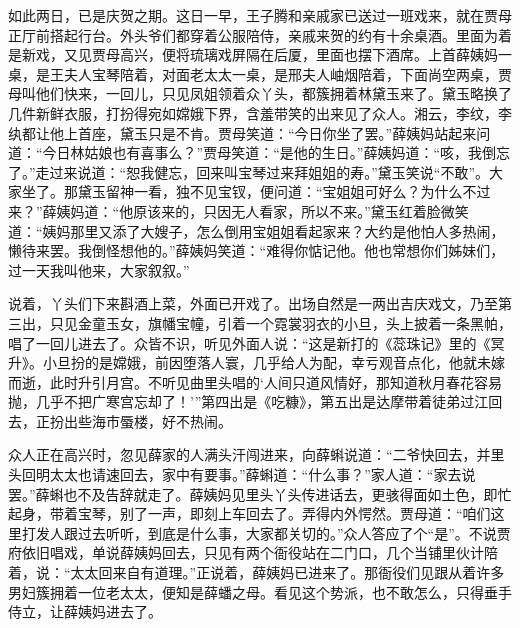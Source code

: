 \begin{parag}
    如此两日，已是庆贺之期。这日一早，王子腾和亲戚家已送过一班戏来，就在贾母正厅前搭起行台。外头爷们都穿着公服陪侍，亲戚来贺的约有十余桌酒。里面为着是新戏，又见贾母高兴，便将琉璃戏屏隔在后厦，里面也摆下酒席。上首薛姨妈一桌，是王夫人宝琴陪着，对面老太太一桌，是邢夫人岫烟陪着，下面尚空两桌，贾母叫他们快来，一回儿，只见凤姐领着众丫头，都簇拥着林黛玉来了。黛玉略换了几件新鲜衣服，打扮得宛如嫦娥下界，含羞带笑的出来见了众人。湘云，李纹，李纨都让他上首座，黛玉只是不肯。贾母笑道：“今日你坐了罢。”薛姨妈站起来问道：“今日林姑娘也有喜事么？”贾母笑道：“是他的生日。”薛姨妈道：“咳，我倒忘了。”走过来说道：“恕我健忘，回来叫宝琴过来拜姐姐的寿。”黛玉笑说“不敢”。大家坐了。那黛玉留神一看，独不见宝钗，便问道：“宝姐姐可好么？为什么不过来？”薛姨妈道：“他原该来的，只因无人看家，所以不来。”黛玉红着脸微笑道：“姨妈那里又添了大嫂子，怎么倒用宝姐姐看起家来？大约是他怕人多热闹，懒待来罢。我倒怪想他的。”薛姨妈笑道：“难得你惦记他。他也常想你们姊妹们，过一天我叫他来，大家叙叙。”
\end{parag}


\begin{parag}
    说着，丫头们下来斟酒上菜，外面已开戏了。出场自然是一两出吉庆戏文，乃至第三出，只见金童玉女，旗幡宝幢，引着一个霓裳羽衣的小旦，头上披着一条黑帕，唱了一回儿进去了。众皆不识，听见外面人说：“这是新打的《蕊珠记》里的《冥升》。小旦扮的是嫦娥，前因堕落人寰，几乎给人为配，幸亏观音点化，他就未嫁而逝，此时升引月宫。不听见曲里头唱的‘人间只道风情好，那知道秋月春花容易抛，几乎不把广寒宫忘却了！’”第四出是《吃糠》，第五出是达摩带着徒弟过江回去，正扮出些海市蜃楼，好不热闹。
\end{parag}


\begin{parag}
    众人正在高兴时，忽见薛家的人满头汗闯进来，向薛蝌说道：“二爷快回去，并里头回明太太也请速回去，家中有要事。”薛蝌道：“什么事？”家人道：“家去说罢。”薛蝌也不及告辞就走了。薛姨妈见里头丫头传进话去，更骇得面如土色，即忙起身，带着宝琴，别了一声，即刻上车回去了。弄得内外愕然。贾母道：“咱们这里打发人跟过去听听，到底是什么事，大家都关切的。”众人答应了个“是”。不说贾府依旧唱戏，单说薛姨妈回去，只见有两个衙役站在二门口，几个当铺里伙计陪着，说：“太太回来自有道理。”正说着，薛姨妈已进来了。那衙役们见跟从着许多男妇簇拥着一位老太太，便知是薛蟠之母。看见这个势派，也不敢怎么，只得垂手侍立，让薛姨妈进去了。
\end{parag}


